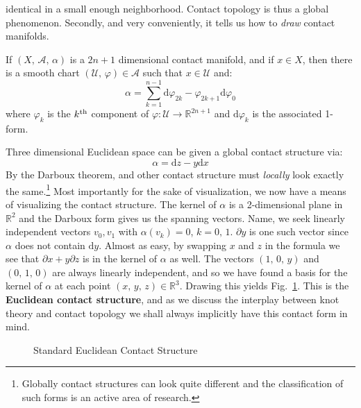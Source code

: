     identical in a small enough neighborhood. Contact topology is thus a global
    phenomenon. Secondly, and very conveniently, it tells us how to
    \textit{draw} contact manifolds.
    \begin{theorem}
        If $(X,\,\mathcal{A},\,\alpha)$ is a $2n+1$ dimensional
        contact manifold, and if $x\in{X}$, then there is a smooth chart
        $(\mathcal{U},\,\varphi)\in\mathcal{A}$ such that $x\in\mathcal{U}$
        and:
        \begin{equation}
            \alpha=
            \sum_{k=1}^{n-1}
            \textrm{d}\varphi_{2k}-\varphi_{2k+1}\textrm{d}\varphi_{0}
        \end{equation}
        where $\varphi_{k}$ is the $k^{\small\textrm{th}}$ component of
        $\varphi:\mathcal{U}\rightarrow\mathbb{R}^{2n+1}$ and
        $\textrm{d}\varphi_{k}$ is the associated 1-form.
    \end{theorem}
    Three dimensional Euclidean space can be given a global contact structure
    via:
    \begin{equation}
        \label{eqn:euclidean_contact_form}
        \alpha=\textrm{d}z-y\textrm{d}x
    \end{equation}
    By the Darboux theorem, and other
    contact structure must \textit{locally} look exactly the same.\footnote{%
        Globally contact structures can look quite different and the
        classification of such forms is an active area of research.
    }
    Most importantly for the sake of visualization, we now have a means of
    visualizing the contact structure. The kernel of $\alpha$ is a
    2-dimensional plane in $\mathbb{R}^{2}$ and the Darboux form gives us the
    spanning vectors. Name, we seek linearly independent vectors $v_{0},v_{1}$
    with $\alpha(v_{k})=0$, $k=0,\,1$. $\partial{y}$ is one such vector since
    $\alpha$ does not contain $\textrm{d}y$. Almost as easy, by swapping $x$
    and $z$ in the formula we see that $\partial{x}+y\partial{z}$ is in the
    kernel of $\alpha$ as well. The vectors $(1,\,0,\,y)$ and $(0,\,1,\,0)$
    are always linearly independent, and so we have found a basis for the
    kernel of $\alpha$ at each point $(x,\,y,\,z)\in\mathbb{R}^{3}$.
    Drawing this yields Fig.~\ref{fig:darboux_form_001}. This is the
    \textbf{Euclidean contact structure}, and as we discuss the interplay
    between knot theory and contact topology we shall always implicitly have
    this contact form in mind.
    \begin{figure}
        \centering
        \caption{Standard Euclidean Contact Structure}
        \label{fig:darboux_form_001}
    \end{figure}

